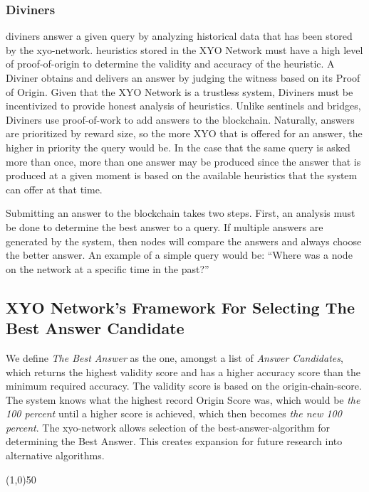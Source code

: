 \documentclass{article}
\begin{document}
\subsubsection {Diviners}
\Glspl{diviner} answer a given query by analyzing historical data that has been stored by the \Gls{xyo-network}. \Glspl{heuristic} stored in the XYO Network must have a high level of \Gls{proof-of-origin} to determine the validity and \gls{accuracy} of the heuristic. A Diviner obtains and delivers an answer by judging the witness based on its Proof of Origin. Given that the XYO Network is a trustless system, Diviners must be incentivized to provide honest analysis of heuristics. Unlike \Glspl{sentinel} and \Glspl{bridge}, Diviners use \Gls{proof-of-work} to add answers to the blockchain. Naturally, answers are prioritized by reward size, so the more XYO that is offered for an answer, the higher in priority the query would be. In the case that the same query is asked more than once, more than one answer may be produced since the answer that is produced at a given moment is based on the available heuristics that the system can offer at that time.

Submitting an answer to the blockchain takes two steps. First, an analysis must be done to determine the best answer to a query. If multiple answers are generated by the system, then nodes will compare the answers and always choose the better answer. An example of a simple query would be: ``Where was a node on the network at a specific time in the past?''

\subsection {XYO Network's Framework For Selecting The Best Answer Candidate}
We define \textit{The Best Answer} as the one, amongst a list of \textit{Answer Candidates}, which returns the highest validity score and has a higher \gls{accuracy} score than the minimum required accuracy. The validity score is based on the \Gls{origin-chain-score}. The system knows what the highest record Origin Score was, which would be \textit{the 100 percent} until a higher score is achieved, which then becomes \textit{the new 100 percent}. The \Gls{xyo-network} allows selection of the \Gls{best-answer-algorithm} for determining the Best Answer. This creates expansion for future research into alternative algorithms.
\begin{center}
\line(1,0){50}
\end{center}
\end{document}
